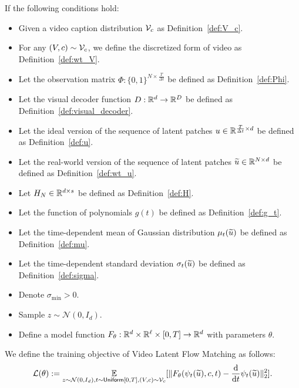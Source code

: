 \begin{definition}\label{def:L}
    If the following conditions hold:
    \begin{itemize}
        \item Given a video caption distribution ${\cal V}_c$ as Definition~\ref{def:V_c}.
        \item For any $(V, c) \sim {\cal V}_c$, we define the discretized form of video as Definition~\ref{def:wt_V}.
        \item Let the observation matrix $\Phi: \{0, 1\}^{N \times \frac{T}{\Delta t}}$ be defined as Definition~\ref{def:Phi}.
        \item Let the visual decoder function $D: \mathbb{R}^d \rightarrow \mathbb{R}^D$ be defined as Definition~\ref{def:visual_decoder}.
        \item Let the ideal version of the sequence of latent patches $u \in \mathbb{R}^{\frac{T}{\Delta t} \times d}$ be defined as Definition~\ref{def:u}.
        \item Let the real-world version of the sequence of latent patches $\widetilde{u} \in \mathbb{R}^{N \times d}$ be defined as Definition~\ref{def:wt_u}.
        \item Let $H_N \in \mathbb{R}^{d \times s}$ be defined as Definition~\ref{def:H}.
        \item Let the function of polynomials $g(t)$ be defined as Definition~\ref{def:g_t}.
        \item Let the time-dependent mean of Gaussian distribution $\mu_t(\widetilde{u})$ be defined as Definition~\ref{def:mu}.
        \item Let the time-dependent standard deviation $\sigma_t(\widetilde{u})$ be defined as Definition~\ref{def:sigma}.
        \item Denote $\sigma_{\min} > 0$.
        \item Sample $z \sim \mathcal{N}(0, I_d)$.
        \item Define a model function $F_\theta: \mathbb{R}^d \times \mathbb{R}^\ell \times [0, T] \rightarrow \mathbb{R}^d$ with parameters $\theta$.
    \end{itemize}
    We define the training objective of Video Latent Flow Matching as follows:
    \begin{align*}
        {\cal L}(\theta) := \operatorname*{{\mathbb{E}}}_{z \sim \mathcal{N}(0, I_d), t \sim {\sf Uniform}[0, T], (V, c) \sim {\cal V}_c}[\| F_\theta( \psi_t(\widetilde{u}), c, t ) - \frac{\mathrm{d} }{\mathrm{d} t} \psi_t(\widetilde{u}) \|_2^2].
    \end{align*}
\end{definition}

